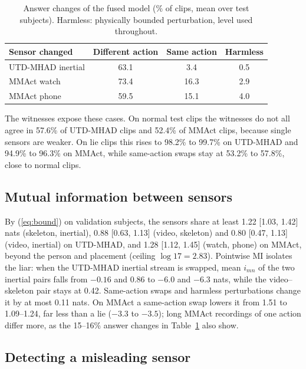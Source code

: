 \documentclass[conference]{IEEEtran}
\begin{document}
\begin{table}[t]
\centering
\caption{Answer changes of the fused model (\% of clips, mean over test subjects). Harmless: physically bounded perturbation, level used throughout.}
\label{tab:flip}
\begin{tabular}{lccc}
\toprule
Sensor changed & Different action & Same action & Harmless \\
\midrule
UTD-MHAD inertial & 63.1 & 3.4 & 0.5 \\
MMAct watch & 73.4 & 16.3 & 2.9 \\
MMAct phone & 59.5 & 15.1 & 4.0 \\
\bottomrule
\end{tabular}
\end{table}

The witnesses expose these cases. On normal test clips the witnesses do not all agree in 57.6\% of UTD-MHAD clips and 52.4\% of MMAct clips, because single sensors are weaker. On lie clips this rises to 98.2\% to 99.7\% on UTD-MHAD and 94.9\% to 96.3\% on MMAct, while same-action swaps stay at 53.2\% to 57.8\%, close to normal clips.

\subsection{Mutual information between sensors}
By (\ref{eq:bound}) on validation subjects, the sensors share at least 1.22 [1.03, 1.42] nats (skeleton, inertial), 0.88 [0.63, 1.13] (video, skeleton) and 0.80 [0.47, 1.13] (video, inertial) on UTD-MHAD, and 1.28 [1.12, 1.45] (watch, phone) on MMAct, beyond the person and placement (ceiling $\log 17=2.83$). Pointwise MI isolates the liar: when the UTD-MHAD inertial stream is swapped, mean $i_{mn}$ of the two inertial pairs falls from $-0.16$ and 0.86 to $-6.0$ and $-6.3$ nats, while the video--skeleton pair stays at 0.42. Same-action swaps and harmless perturbations change it by at most 0.11 nats. On MMAct a same-action swap lowers it from 1.51 to 1.09--1.24, far less than a lie ($-3.3$ to $-3.5$); long MMAct recordings of one action differ more, as the 15--16\% answer changes in Table~\ref{tab:flip} also show.

\subsection{Detecting a misleading sensor}
\end{document}
